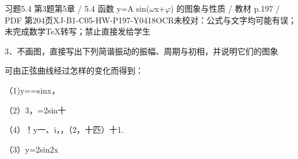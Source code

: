 \begin{bankitem}{习题5.4 第3题}{第5章 / 5.4 函数 y=A sin(\ensuremath{\omega}x+\ensuremath{\varphi}) 的图象与性质 / 教材 p.197 / PDF 第204页}{XJ-B1-C05-HW-P197-Y0418}{OCR未校对：公式与文字均可能有误；未完成数学TeX转写；禁止直接发给学生}
\begin{ocrdraft}
\par
3．不画图，直接写出下列简谐振动的振幅、周期与初相，并说明它们的图象
\par
可由正弦曲线经过怎样的变化而得到：
\par
（1)y==sinx，
\par
（2）3，=2sin十
\par
（4）！y一、i，，（2，十匹）十1.
\par
（3）y=2sin2x
\end{ocrdraft}
\end{bankitem}
